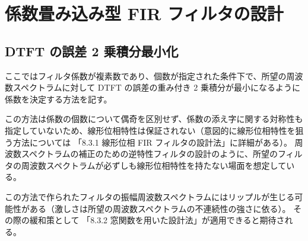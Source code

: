 \section{係数畳み込み型 FIR フィルタの設計}
    \subsection{DTFT の誤差 2 乗積分最小化}
        \newcommand{\Hideal}{H_\text{ideal}}
        \newcommand{\vhOpt}{\bm{h}_\text{opt}}
        ここではフィルタ係数が複素数であり、個数が指定された条件下で、所望の周波数スペクトラムに対して DTFT の誤差の重み付き 2 乗積分が最小になるように係数を決定する方法を記す。
        \par
        この方法は係数の個数について偶奇を区別せず、係数の添え字に関する対称性も指定していないため、線形位相特性は保証されない（意図的に線形位相特性を狙う方法については \cite{learn_sp_from_basic} 「8.3.1 線形位相 FIR フィルタの設計法」に詳細がある）。
        周波数スペクトラムの補正のための逆特性フィルタの設計のように、所望のフィルタの周波数スペクトラムが必ずしも線形位相特性を持たない場面を想定している。
        \par
        この方法で作られたフィルタの振幅周波数スペクトラムにはリップルが生じる可能性がある（激しさは所望の周波数スペクトラムの不連続性の強さに依る）。
        その際の緩和策として \cite{learn_sp_from_basic} 「8.3.2 窓関数を用いた設計法」が適用できると期待される。

